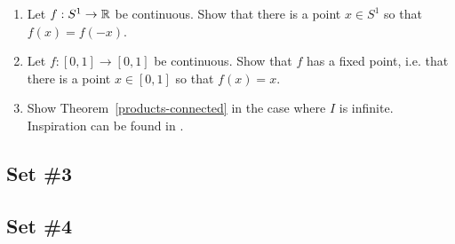 \begin{enumerate}
  \item Let $f : S^1 \to \mathbb{R}$ be continuous. Show that there is a point $x \in S^1$ so that $f(x) = f(-x)$.
  \item Let $f : [0,1] \to [0,1]$ be continuous. Show that $f$ has a fixed point, i.e. that there is a point $x \in [0,1]$ so that $f(x) = x$.
  \item \label{exercise-products-connected} Show Theorem~\ref{products-connected} in the case where $I$ is infinite. Inspiration can be found in \cite[Thm.~4.5]{Fje}.
\end{enumerate}

\subsection{Set \#3}

\subsection{Set \#4}
